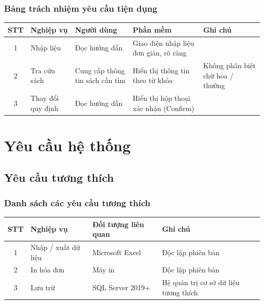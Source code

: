 \documentclass[12pt]{report}
\begin{document}
            \subsubsection{Bảng trách nhiệm yêu cầu tiện dụng}
                \begin{tabularx}{\textwidth}{|c|>{\RaggedRight}X|>{\RaggedRight}X|>{\RaggedRight}X|>{\RaggedRight}X|}
                    \hline
                    \textbf{STT} & \textbf{Nghiệp vụ} & 
                    \textbf{Người dùng} & \textbf{Phần mềm} & Ghi chú \\ \hline
                    1 & Nhập liệu & Đọc hướng dẫn & Giao diện nhập liệu đơn giản, rõ ràng & \\ \hline
                    2 & Tra cứu sách & Cung cấp thông tin sách cần tìm & Hiển thị thông tin theo từ khóa & Không phân biệt chữ hoa / thường \\ \hline
                    3 & Thay đổi quy định & Đọc hướng dẫn & Hiển thị hộp thoại xác nhận (Confirm) & \\ \hline
                \end{tabularx}
    \section{Yêu cầu hệ thống}
        \subsection{Yêu cầu tương thích}
            \subsubsection{Danh sách các yêu cầu tương thích}
                \begin{tabularx}{\textwidth}{|c|l|>{\RaggedRight}X|>{\RaggedRight}X|}
                    \hline
                    \textbf{STT} & \textbf{Nghiệp vụ} & 
                    \textbf{Đối tượng liên quan} & \textbf{Ghi chú} \\ \hline
                    1 & Nhập / xuất dữ liệu & Microsoft Excel & Độc lập phiên bản \\ \hline
                    2 & In hóa đơn & Máy in & Độc lập phiên bản \\ \hline
                    3 & Lưu trữ & SQL Server 2019+ & Hệ quản trị cơ sở dữ liệu tương thích \\ \hline
                \end{tabularx}
\end{document}
